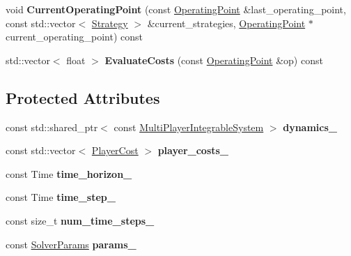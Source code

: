 \begin{DoxyCompactItemize}
\item 
void {\bfseries Current\+Operating\+Point} (const \hyperlink{structilqgames_1_1_operating_point}{Operating\+Point} \&last\+\_\+operating\+\_\+point, const std\+::vector$<$ \hyperlink{structilqgames_1_1_strategy}{Strategy} $>$ \&current\+\_\+strategies, \hyperlink{structilqgames_1_1_operating_point}{Operating\+Point} $\ast$current\+\_\+operating\+\_\+point) const \hypertarget{classilqgames_1_1_game_solver_ae13927d570a00ff73c9556218bff773d}{}\label{classilqgames_1_1_game_solver_ae13927d570a00ff73c9556218bff773d}

\item 
std\+::vector$<$ float $>$ {\bfseries Evaluate\+Costs} (const \hyperlink{structilqgames_1_1_operating_point}{Operating\+Point} \&op) const \hypertarget{classilqgames_1_1_game_solver_a38e4812eb9b9537d5a0811a9bf85df97}{}\label{classilqgames_1_1_game_solver_a38e4812eb9b9537d5a0811a9bf85df97}

\end{DoxyCompactItemize}
\subsection*{Protected Attributes}
\begin{DoxyCompactItemize}
\item 
const std\+::shared\+\_\+ptr$<$ const \hyperlink{classilqgames_1_1_multi_player_integrable_system}{Multi\+Player\+Integrable\+System} $>$ {\bfseries dynamics\+\_\+}\hypertarget{classilqgames_1_1_game_solver_addd321f0c2c7a760bccd2e4f043b3725}{}\label{classilqgames_1_1_game_solver_addd321f0c2c7a760bccd2e4f043b3725}

\item 
const std\+::vector$<$ \hyperlink{classilqgames_1_1_player_cost}{Player\+Cost} $>$ {\bfseries player\+\_\+costs\+\_\+}\hypertarget{classilqgames_1_1_game_solver_a7ec8e339dd5dfd05a1bebfaa4ebc4c9c}{}\label{classilqgames_1_1_game_solver_a7ec8e339dd5dfd05a1bebfaa4ebc4c9c}

\item 
const Time {\bfseries time\+\_\+horizon\+\_\+}\hypertarget{classilqgames_1_1_game_solver_ae515fafef0ee7df96cfe1447d9f35581}{}\label{classilqgames_1_1_game_solver_ae515fafef0ee7df96cfe1447d9f35581}

\item 
const Time {\bfseries time\+\_\+step\+\_\+}\hypertarget{classilqgames_1_1_game_solver_ae1e0efeb25072ac9f21699b82071c6ab}{}\label{classilqgames_1_1_game_solver_ae1e0efeb25072ac9f21699b82071c6ab}

\item 
const size\+\_\+t {\bfseries num\+\_\+time\+\_\+steps\+\_\+}\hypertarget{classilqgames_1_1_game_solver_a8a95abeb47770462608d2f34b97c974e}{}\label{classilqgames_1_1_game_solver_a8a95abeb47770462608d2f34b97c974e}

\item 
const \hyperlink{structilqgames_1_1_solver_params}{Solver\+Params} {\bfseries params\+\_\+}\hypertarget{classilqgames_1_1_game_solver_adb70fc48a6420c1b516becd5c108a92a}{}\label{classilqgames_1_1_game_solver_adb70fc48a6420c1b516becd5c108a92a}

\end{DoxyCompactItemize}


